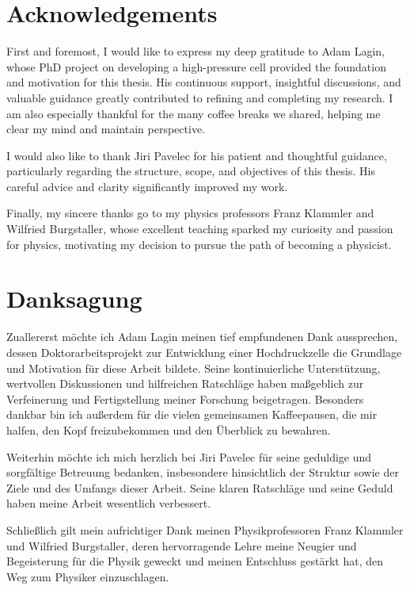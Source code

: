 \section*{Acknowledgements}
First and foremost, I would like to express my deep gratitude to Adam Lagin, whose PhD project on developing a high-pressure cell provided the foundation and motivation for this thesis. His continuous support, insightful discussions, and valuable guidance greatly contributed to refining and completing my research. I am also especially thankful for the many coffee breaks we shared, helping me clear my mind and maintain perspective.

\vspace{0.5cm}

I would also like to thank Jiri Pavelec for his patient and thoughtful guidance, particularly regarding the structure, scope, and objectives of this thesis. His careful advice and clarity significantly improved my work.

\vspace{0.5cm}

Finally, my sincere thanks go to my physics professors Franz Klammler and Wilfried Burgstaller, whose excellent teaching sparked my curiosity and passion for physics, motivating my decision to pursue the path of becoming a physicist.

\blankpage

\section*{Danksagung}
Zuallererst möchte ich Adam Lagin meinen tief empfundenen Dank aussprechen, dessen Doktorarbeitsprojekt zur Entwicklung einer Hochdruckzelle die Grundlage und Motivation für diese Arbeit bildete. Seine kontinuierliche Unterstützung, wertvollen Diskussionen und hilfreichen Ratschläge haben maßgeblich zur Verfeinerung und Fertigstellung meiner Forschung beigetragen. Besonders dankbar bin ich außerdem für die vielen gemeinsamen Kaffeepausen, die mir halfen, den Kopf freizubekommen und den Überblick zu bewahren.

\vspace{0.5cm}

Weiterhin möchte ich mich herzlich bei Jiri Pavelec für seine geduldige und sorgfältige Betreuung bedanken, insbesondere hinsichtlich der Struktur sowie der Ziele und des Umfangs dieser Arbeit. Seine klaren Ratschläge und seine Geduld haben meine Arbeit wesentlich verbessert.

\vspace{0.5cm}

Schließlich gilt mein aufrichtiger Dank meinen Physikprofessoren Franz Klammler und Wilfried Burgstaller, deren hervorragende Lehre meine Neugier und Begeisterung für die Physik geweckt und meinen Entschluss gestärkt hat, den Weg zum Physiker einzuschlagen.
\blankpage
